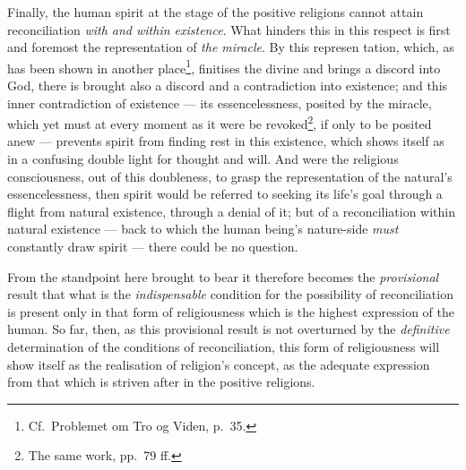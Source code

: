 \documentclass[12pt,a4paper]{book}
\begin{document}
Finally, the human spirit at the stage of the positive religions cannot attain
reconciliation \emph{with and within existence}. What hinders this in this
respect is first and foremost the representation of \emph{the miracle}. By
this represen\-%
\setcounter{footnote}{0}%
tation, which, as has been shown in another place\footnote{Cf.\ Problemet om
Tro og Viden, p.\ 35.}, finitises the divine and brings a discord into God,
there is brought also a discord and a contradiction into existence; and this
inner contradiction of existence --- its essencelessness, posited by the
miracle, which yet must at every moment as it were be revoked\footnote{The
same work, pp.\ 79 ff.}, if only to be posited anew --- prevents spirit from
finding rest in this existence, which shows itself as in a confusing double
light for thought and will. And were the religious consciousness, out of this
doubleness, to grasp the representation of the natural's essencelessness, then
spirit would be referred to seeking its life's goal through a flight from
natural existence, through a denial of it; but of a reconciliation within
natural existence --- back to which the human being's nature-side
\emph{must} constantly draw spirit --- there could be no question.

From the standpoint here brought to bear it therefore becomes the
\emph{provisional} result that what is the \emph{indispensable} condition for
the possibility of reconciliation is present only in that form of
religiousness which is the highest expression of the human. So far, then, as
this provisional result is not overturned by the \emph{definitive}
determination of the conditions of reconciliation, this form of religiousness
will show itself as the realisation of religion's concept, as the adequate
expression from that which is striven after in the positive religions.
\end{document}
